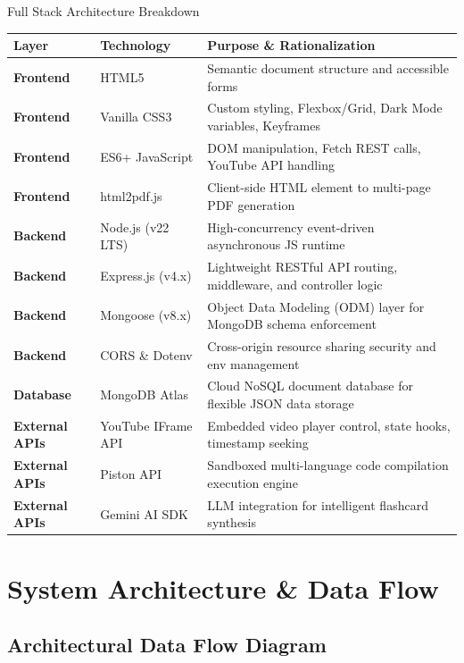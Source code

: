 \documentclass[12pt,a4paper]{article}
\begin{document}
\begin{techbox}{Full Stack Architecture Breakdown}
\begin{tabularx}{\textwidth}{l l X}
\toprule
\textbf{Layer} & \textbf{Technology} & \textbf{Purpose \& Rationalization} \\
\midrule
\textbf{Frontend} & HTML5 & Semantic document structure and accessible forms \\
\textbf{Frontend} & Vanilla CSS3 & Custom styling, Flexbox/Grid, Dark Mode variables, Keyframes \\
\textbf{Frontend} & ES6+ JavaScript & DOM manipulation, Fetch REST calls, YouTube API handling \\
\textbf{Frontend} & html2pdf.js & Client-side HTML element to multi-page PDF generation \\
\midrule
\textbf{Backend} & Node.js (v22 LTS) & High-concurrency event-driven asynchronous JS runtime \\
\textbf{Backend} & Express.js (v4.x) & Lightweight RESTful API routing, middleware, and controller logic \\
\textbf{Backend} & Mongoose (v8.x) & Object Data Modeling (ODM) layer for MongoDB schema enforcement \\
\textbf{Backend} & CORS \& Dotenv & Cross-origin resource sharing security and env management \\
\midrule
\textbf{Database} & MongoDB Atlas & Cloud NoSQL document database for flexible JSON data storage \\
\midrule
\textbf{External APIs} & YouTube IFrame API & Embedded video player control, state hooks, timestamp seeking \\
\textbf{External APIs} & Piston API & Sandboxed multi-language code compilation execution engine \\
\textbf{External APIs} & Gemini AI SDK & LLM integration for intelligent flashcard synthesis \\
\bottomrule
\end{tabularx}
\end{techbox}

\section{System Architecture \& Data Flow}

\subsection{Architectural Data Flow Diagram}
\end{document}
